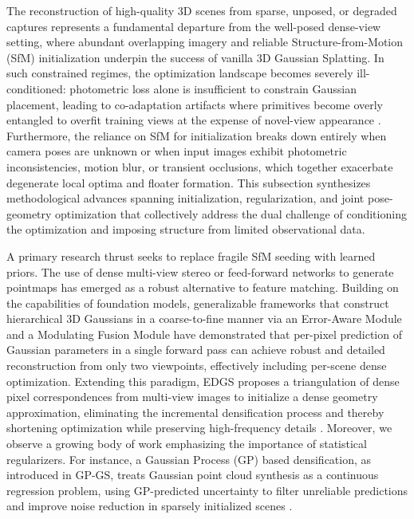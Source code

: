 \documentclass[11pt,a4paper]{article}
\begin{document}
The reconstruction of high-quality 3D scenes from sparse, unposed, or degraded captures represents a fundamental departure from the well-posed dense-view setting, where abundant overlapping imagery and reliable Structure-from-Motion (SfM) initialization underpin the success of vanilla 3D Gaussian Splatting. In such constrained regimes, the optimization landscape becomes severely ill-conditioned: photometric loss alone is insufficient to constrain Gaussian placement, leading to co-adaptation artifacts where primitives become overly entangled to overfit training views at the expense of novel-view appearance \cite{arxiv:2508.12720v3}. Furthermore, the reliance on SfM for initialization breaks down entirely when camera poses are unknown or when input images exhibit photometric inconsistencies, motion blur, or transient occlusions, which together exacerbate degenerate local optima and floater formation. This subsection synthesizes methodological advances spanning initialization, regularization, and joint pose-geometry optimization that collectively address the dual challenge of conditioning the optimization and imposing structure from limited observational data.

A primary research thrust seeks to replace fragile SfM seeding with learned priors. The use of dense multi-view stereo or feed-forward networks to generate pointmaps has emerged as a robust alternative to feature matching. Building on the capabilities of foundation models, generalizable frameworks \cite{arxiv:2410.06245v1} that construct hierarchical 3D Gaussians in a coarse-to-fine manner via an Error-Aware Module and a Modulating Fusion Module have demonstrated that per-pixel prediction of Gaussian parameters in a single forward pass can achieve robust and detailed reconstruction from only two viewpoints, effectively including per-scene dense optimization. Extending this paradigm, EDGS proposes a triangulation of dense pixel correspondences from multi-view images to initialize a dense geometry approximation, eliminating the incremental densification process and thereby shortening optimization while preserving high-frequency details \cite{arxiv:2504.13204v2}. Moreover, we observe a growing body of work emphasizing the importance of statistical regularizers. For instance, a Gaussian Process (GP) based densification, as introduced in GP-GS, treats Gaussian point cloud synthesis as a continuous regression problem, using GP-predicted uncertainty to filter unreliable predictions and improve noise reduction in sparsely initialized scenes \cite{arxiv:2502.02283v6}.
\end{document}
